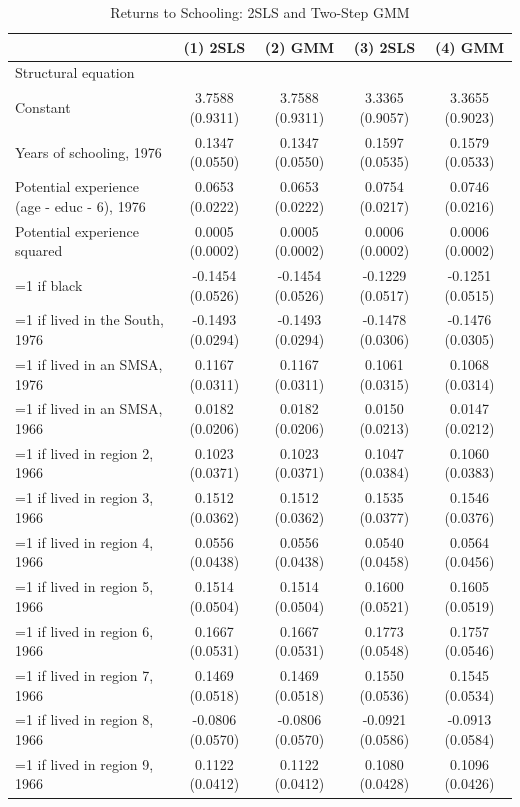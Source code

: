 \begin{table}
\caption{Returns to Schooling: 2SLS and Two-Step GMM}
\label{tab:card_iv_gmm}
\begin{tabular}{lcccc}
\toprule
 & (1) 2SLS & (2) GMM & (3) 2SLS & (4) GMM \\
\midrule
Structural equation &  &  &  &  \\
Constant & 3.7588 (0.9311) & 3.7588 (0.9311) & 3.3365 (0.9057) & 3.3655 (0.9023) \\
Years of schooling, 1976 & 0.1347 (0.0550) & 0.1347 (0.0550) & 0.1597 (0.0535) & 0.1579 (0.0533) \\
Potential experience (age - educ - 6), 1976 & 0.0653 (0.0222) & 0.0653 (0.0222) & 0.0754 (0.0217) & 0.0746 (0.0216) \\
Potential experience squared & 0.0005 (0.0002) & 0.0005 (0.0002) & 0.0006 (0.0002) & 0.0006 (0.0002) \\
=1 if black & -0.1454 (0.0526) & -0.1454 (0.0526) & -0.1229 (0.0517) & -0.1251 (0.0515) \\
=1 if lived in the South, 1976 & -0.1493 (0.0294) & -0.1493 (0.0294) & -0.1478 (0.0306) & -0.1476 (0.0305) \\
=1 if lived in an SMSA, 1976 & 0.1167 (0.0311) & 0.1167 (0.0311) & 0.1061 (0.0315) & 0.1068 (0.0314) \\
=1 if lived in an SMSA, 1966 & 0.0182 (0.0206) & 0.0182 (0.0206) & 0.0150 (0.0213) & 0.0147 (0.0212) \\
=1 if lived in region 2, 1966 & 0.1023 (0.0371) & 0.1023 (0.0371) & 0.1047 (0.0384) & 0.1060 (0.0383) \\
=1 if lived in region 3, 1966 & 0.1512 (0.0362) & 0.1512 (0.0362) & 0.1535 (0.0377) & 0.1546 (0.0376) \\
=1 if lived in region 4, 1966 & 0.0556 (0.0438) & 0.0556 (0.0438) & 0.0540 (0.0458) & 0.0564 (0.0456) \\
=1 if lived in region 5, 1966 & 0.1514 (0.0504) & 0.1514 (0.0504) & 0.1600 (0.0521) & 0.1605 (0.0519) \\
=1 if lived in region 6, 1966 & 0.1667 (0.0531) & 0.1667 (0.0531) & 0.1773 (0.0548) & 0.1757 (0.0546) \\
=1 if lived in region 7, 1966 & 0.1469 (0.0518) & 0.1469 (0.0518) & 0.1550 (0.0536) & 0.1545 (0.0534) \\
=1 if lived in region 8, 1966 & -0.0806 (0.0570) & -0.0806 (0.0570) & -0.0921 (0.0586) & -0.0913 (0.0584) \\
=1 if lived in region 9, 1966 & 0.1122 (0.0412) & 0.1122 (0.0412) & 0.1080 (0.0428) & 0.1096 (0.0426) \\

\end{tabular}
\end{table}
